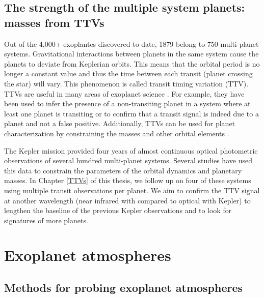 
\subsection{The strength of the multiple system planets: masses from TTVs}%

Out of the 4,000+ exoplantes discovered to date, 1879 belong to 750 multi-planet systems. Gravitational interactions between planets in the same system cause the planets to deviate from Keplerian orbits. This means that the orbital period is no longer a constant value and thus the time between each transit (planet crossing the star) will vary. This phenomenon is called transit timing variation (TTV). TTVs are useful in many areas of exoplanet science \citep[e.g.,][]{Schneider2003, Agol2005, Holman2005}. For example, they have been used to infer the presence of a non-transiting planet in a system where at least one planet is transiting or to confirm that a transit signal is indeed due to a planet and not a false positive. Additionally, TTVs can be used for planet characterization by constraining the masses and other orbital elements \citep[e.g.,][]{Ballard2011, Holman2010, Carter2012}.

 The Kepler mission provided four years of almost continuous optical photometric observations of several hundred multi-planet systems. Several studies have used this data to constrain the parameters of the orbital dynamics and planetary masses. In Chapter \ref{TTVs} of this thesis, we follow up on four of these systems using multiple transit observations per planet. We aim to confirm the TTV signal at another wavelength (near infrared with \spitzerIRAC compared to optical with Kepler) to lengthen the baseline of the previous Kepler observations and to look for signatures of more planets.

\section{Exoplanet atmospheres}
\subsection{Methods for probing exoplanet atmospheres}%

